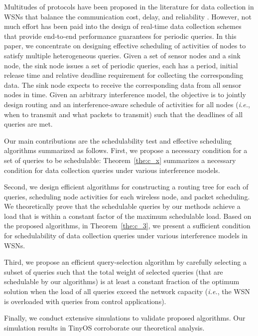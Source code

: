 \documentclass[conference,10pt]{IEEEtran}\usepackage{amsmath}
\def\ie{\textit{i.e.}\xspace}
\begin{document}
Multitudes of protocols have been proposed in the literature for data
 collection in WSNs that balance the communication cost, delay, and reliability
\cite{lee2008teo}.
 However, not much effort has been paid into the design of real-time data collection schemes
 that provide end-to-end performance guarantees for periodic queries.
In this paper, we concentrate on designing effective
 scheduling of activities of nodes to satisfy
 multiple heterogeneous queries.
Given a set of sensor nodes
 and a sink node,
 the sink node issues a set of periodic queries, each
 has a period, initial release time
 and relative deadline requirement for collecting the corresponding data.
The sink node expects to receive the corresponding data from all sensor nodes in time.
Given an arbitrary interference model,
 the objective is to jointly design routing
 and an
 interference-aware schedule of activities for all nodes (\ie, when to
 transmit and what packets to transmit) such that the deadlines of all queries are met.

Our main contributions are the
 schedulability test and effective scheduling algorithms
  summarized as follows. 
First, we propose a necessary condition for a set of queries to be
schedulable:
 Theorem~\ref{the:c_x} summarizes a necessary condition for data
collection queries under various interference models.

Second, 
 we design efficient algorithms for constructing a routing tree for
each of queries, scheduling node activities for each wireless node,
and packet scheduling. We theoretically prove that the schedulable
queries by our methods achieve a load that is within a constant
factor of the maximum schedulable load. Based on the proposed
algorithms, in Theorem~\ref{the:c_3}, we present a sufficient condition for
 schedulability of data collection queries under various interference models in WSNs.

Third,
  we propose an efficient query-selection algorithm by carefully selecting
 a subset of queries such that
 the total weight of selected  queries (that are schedulable by our
 algorithms) is at least a constant fraction of the optimum solution
 when the load of all queries exceed the network capacity (\ie,
 the WSN is overloaded with queries from control applications).

Finally, we conduct extensive
 simulations to validate proposed algorithms. Our simulation
 results
 in TinyOS
 corroborate our theoretical analysis.
\end{document}
